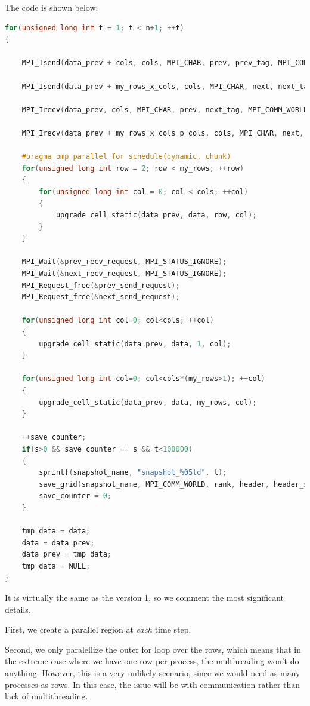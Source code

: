 \documentclass{report}
\begin{document}
The code is shown below:

\begin{lstlisting}[language=C++]
for(unsigned long int t = 1; t < n+1; ++t)
{

    MPI_Isend(data_prev + cols, cols, MPI_CHAR, prev, prev_tag, MPI_COMM_WORLD, &prev_send_request);

    MPI_Isend(data_prev + my_rows_x_cols, cols, MPI_CHAR, next, next_tag, MPI_COMM_WORLD, &next_send_request);

    MPI_Irecv(data_prev, cols, MPI_CHAR, prev, next_tag, MPI_COMM_WORLD, &prev_recv_request);

    MPI_Irecv(data_prev + my_rows_x_cols_p_cols, cols, MPI_CHAR, next, prev_tag, MPI_COMM_WORLD, &next_recv_request);

    #pragma omp parallel for schedule(dynamic, chunk)
    for(unsigned long int row = 2; row < my_rows; ++row)
    {
        for(unsigned long int col = 0; col < cols; ++col)
        {
            upgrade_cell_static(data_prev, data, row, col);
        }
    }

    MPI_Wait(&prev_recv_request, MPI_STATUS_IGNORE);
    MPI_Wait(&next_recv_request, MPI_STATUS_IGNORE);
    MPI_Request_free(&prev_send_request);
    MPI_Request_free(&next_send_request);

    for(unsigned long int col=0; col<cols; ++col)
    {
        upgrade_cell_static(data_prev, data, 1, col);
    }

    for(unsigned long int col=0; col<cols*(my_rows>1); ++col)
    {
        upgrade_cell_static(data_prev, data, my_rows, col);
    }

    ++save_counter;
    if(s>0 && save_counter == s && t<100000)
    {
        sprintf(snapshot_name, "snapshot_%05ld", t);
        save_grid(snapshot_name, MPI_COMM_WORLD, rank, header, header_size, my_total_file_offset, data, my_rows, cols);
        save_counter = 0;
    }

    tmp_data = data;
    data = data_prev;
    data_prev = tmp_data;
    tmp_data = NULL;
}
\end{lstlisting}

It is virtually the same as the version 1, so we comment the most significant 
details. 

First, we create a parallel region at \textit{each} time step. 

Second, we only paralellize the outer for loop over the rows, which means that 
in the extreme case where we have one row per process, the multhreading won't do 
anything. However, this is a very unlikely scenario, since we would need as many
processes as rows. In this case, the issue will be with communication 
rather than lack of multithreading.
\end{document}
